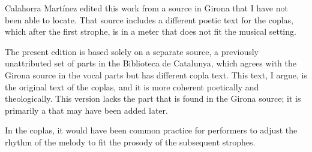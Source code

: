 \begin{notesources}
    \begin{source}
    \end{source}
    \begin{source}
    \end{source}
\end{notesources}

Calahorra Martínez edited this work from a source in Girona that I have not
been able to locate.
That source includes a different poetic text for the coplas, which after the
first strophe, is in a meter that does not fit the musical setting.

The present edition is based solely on a separate source, a previously
unattributed set of parts in the Biblioteca de Catalunya, which agrees with
the Girona source in the vocal parts but has different copla text.
This text, I argue, is the original text of the coplas, and it is more
coherent poetically and theologically.
This version lacks the  part that is found in the Girona
source; it is primarily a  that may have been added
later.

In the coplas, it would have been common practice for performers to adjust the
rhythm of the melody to fit the prosody of the subsequent strophes.
\endinput
